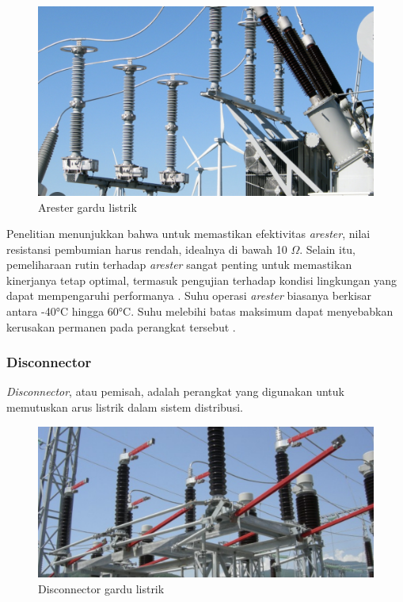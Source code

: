 \begin{figure} [H] \centering
  \includegraphics[scale=0.45]{gambar/arestar.png}
  \caption{Arester gardu listrik}
  \label{fig:Arester gardu listrik}
\end{figure}

Penelitian menunjukkan bahwa untuk memastikan efektivitas \emph{arester}, nilai resistansi pembumian harus rendah, idealnya di bawah 10 $\Omega$. Selain itu, pemeliharaan rutin terhadap \emph{arester} sangat penting untuk memastikan kinerjanya tetap optimal, termasuk pengujian terhadap kondisi lingkungan yang dapat mempengaruhi performanya \cite{Suputra2024}. Suhu operasi \emph{arester} biasanya berkisar antara -40°C hingga 60°C. Suhu melebihi batas maksimum dapat menyebabkan kerusakan permanen pada perangkat tersebut \cite{Kartika2022}.

\subsubsection{Disconnector}
\emph{Disconnector}, atau pemisah, adalah perangkat yang digunakan untuk memutuskan arus listrik dalam sistem distribusi. 
\begin{figure} [H] \centering
  \includegraphics[scale=0.45]{gambar/disconector.png}
  \caption{Disconnector gardu listrik}
  \label{fig:Disconnector gardu listrik}
\end{figure}

